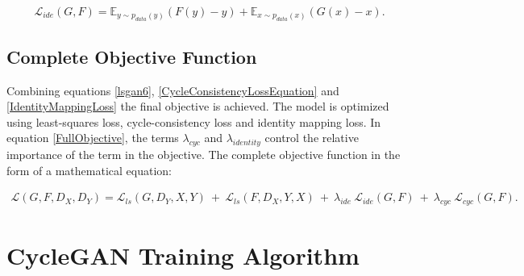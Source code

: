\begin{equation}\label{IdentityMappingLoss}
    \mathcal{L}_{ide}(G, F) = \mathbb{E}_{y \sim p_{data}(y)}(F(y) - y) + \mathbb{E}_{x \sim p_{data}(x)}(G(x) - x).
    \end{equation}

\subsection{Complete Objective Function}

Combining equations \ref{lsgan6}, \ref{CycleConsistencyLossEquation} and \ref{IdentityMappingLoss} the final objective is achieved. The model is optimized using least-squares loss, cycle-consistency loss and identity mapping loss. In equation \ref{FullObjective}, the terms $\lambda_{cyc}$ and $\lambda_{identity}$ control the relative importance of the term in the objective. The complete objective function in the form of a mathematical equation:

\begin{equation}\label{FullObjective}
\begin{aligned}
    \mathcal{L}(G, F, D_X, D_Y) =  \mathcal{L}_{ls}(G, D_Y, X, Y)\ +\ \mathcal{L}_{ls}(F, D_X, Y, X)\ +\ 
    \lambda_{ide}\ \mathcal{L}_{ide}(G, F)\ +\ \lambda_{cyc}\ \mathcal{L}_{cyc}(G, F).
\end{aligned}
\end{equation}
    

\section{\ac{CycleGAN} Training Algorithm}\label{CycleGANAlgorithm}



